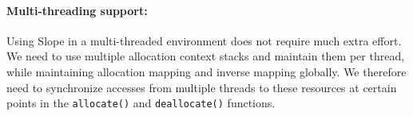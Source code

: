 \paragraph{Multi-threading support:} Using Slope in a multi-threaded
environment does not require much extra effort. We need to use multiple
allocation context stacks and maintain them per thread, while maintaining
allocation mapping and inverse mapping globally. We therefore need to
synchronize accesses from multiple threads to these resources at certain points
in the \texttt{allocate()} and \texttt{deallocate()} functions.
